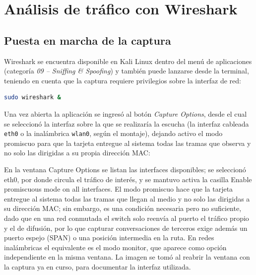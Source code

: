 \section{Análisis de tráfico con Wireshark}

\subsection{Puesta en marcha de la captura}

Wireshark se encuentra disponible en Kali Linux dentro del menú de aplicaciones (categoría \emph{09 -- Sniffing \& Spoofing}) y también puede lanzarse desde la terminal, teniendo en cuenta que la captura requiere privilegios sobre la interfaz de red:

\begin{lstlisting}[language=bash]
sudo wireshark &
\end{lstlisting}

Una vez abierta la aplicación se ingresó al botón \emph{Capture Options}, desde el cual se seleccionó la interfaz sobre la que se realizaría la escucha (la interfaz cableada \texttt{eth0} o la inalámbrica \texttt{wlan0}, según el montaje), dejando activo el modo promiscuo para que la tarjeta entregue al sistema todas las tramas que observa y no solo las dirigidas a su propia dirección MAC:


\begin{analisis}




En la ventana Capture Options se listan las interfaces disponibles; se seleccionó eth0, por donde circula el tráfico de interés, y se mantuvo activa la casilla Enable promiscuous mode on all interfaces. El modo promiscuo hace que la tarjeta entregue al sistema todas las tramas que llegan al medio y no solo las dirigidas a su dirección MAC; sin embargo, es una condición necesaria pero no suficiente, dado que en una red conmutada el switch solo reenvía al puerto el tráfico propio y el de difusión, por lo que capturar conversaciones de terceros exige además un puerto espejo (SPAN) o una posición intermedia en la ruta. En redes inalámbricas el equivalente es el modo monitor, que aparece como opción independiente en la misma ventana. La imagen se tomó al reabrir la ventana con la captura ya en curso, para documentar la interfaz utilizada.
\end{analisis}

